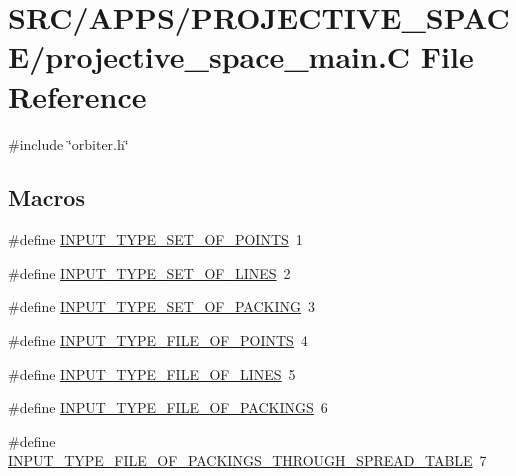 \hypertarget{projective__space__main_8_c}{}\section{S\+R\+C/\+A\+P\+P\+S/\+P\+R\+O\+J\+E\+C\+T\+I\+V\+E\+\_\+\+S\+P\+A\+C\+E/projective\+\_\+space\+\_\+main.C File Reference}
\label{projective__space__main_8_c}
{\ttfamily \#include \char`\"{}orbiter.\+h\char`\"{}}\newline
\subsection*{Macros}
\begin{DoxyCompactItemize}
\item 
\#define \mbox{\hyperlink{projective__space__main_8_c_aeda470f1e883f29f050676e0aa64acde}{I\+N\+P\+U\+T\+\_\+\+T\+Y\+P\+E\+\_\+\+S\+E\+T\+\_\+\+O\+F\+\_\+\+P\+O\+I\+N\+TS}}~1
\item 
\#define \mbox{\hyperlink{projective__space__main_8_c_a0c47a4b0733f5b79d8c4e7614aacae9e}{I\+N\+P\+U\+T\+\_\+\+T\+Y\+P\+E\+\_\+\+S\+E\+T\+\_\+\+O\+F\+\_\+\+L\+I\+N\+ES}}~2
\item 
\#define \mbox{\hyperlink{projective__space__main_8_c_a19abeed71fe9c5da738db86c08b0f9c0}{I\+N\+P\+U\+T\+\_\+\+T\+Y\+P\+E\+\_\+\+S\+E\+T\+\_\+\+O\+F\+\_\+\+P\+A\+C\+K\+I\+NG}}~3
\item 
\#define \mbox{\hyperlink{projective__space__main_8_c_a9a56e20a90464a9bdaaf1e01b879fb3b}{I\+N\+P\+U\+T\+\_\+\+T\+Y\+P\+E\+\_\+\+F\+I\+L\+E\+\_\+\+O\+F\+\_\+\+P\+O\+I\+N\+TS}}~4
\item 
\#define \mbox{\hyperlink{projective__space__main_8_c_a0fb86fbcc19f8e38e125003aaf4d42c6}{I\+N\+P\+U\+T\+\_\+\+T\+Y\+P\+E\+\_\+\+F\+I\+L\+E\+\_\+\+O\+F\+\_\+\+L\+I\+N\+ES}}~5
\item 
\#define \mbox{\hyperlink{projective__space__main_8_c_aab09205735a84524167452c1e6685c1a}{I\+N\+P\+U\+T\+\_\+\+T\+Y\+P\+E\+\_\+\+F\+I\+L\+E\+\_\+\+O\+F\+\_\+\+P\+A\+C\+K\+I\+N\+GS}}~6
\item 
\#define \mbox{\hyperlink{projective__space__main_8_c_a88c2639da14a693fb35c059fc93f6dc1}{I\+N\+P\+U\+T\+\_\+\+T\+Y\+P\+E\+\_\+\+F\+I\+L\+E\+\_\+\+O\+F\+\_\+\+P\+A\+C\+K\+I\+N\+G\+S\+\_\+\+T\+H\+R\+O\+U\+G\+H\+\_\+\+S\+P\+R\+E\+A\+D\+\_\+\+T\+A\+B\+LE}}~7
\end{DoxyCompactItemize}
